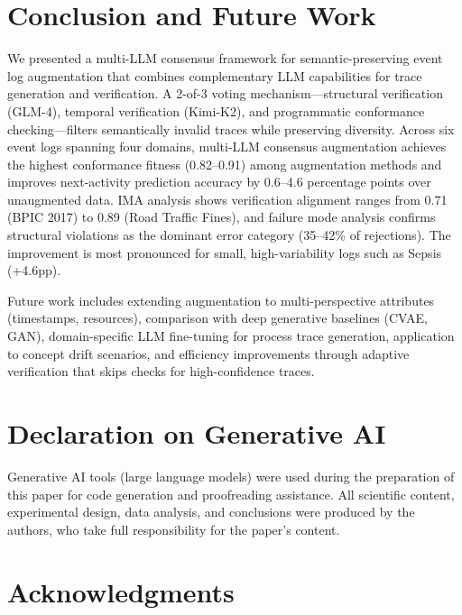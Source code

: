 \documentclass[11pt,a4paper]{article}
\newenvironment{acknowledgments}{\section*{Acknowledgments}}{\par}
\begin{document}
\section{Conclusion and Future Work}

We presented a multi-LLM consensus framework for semantic-preserving event log augmentation that combines complementary LLM capabilities for trace generation and verification. A 2-of-3 voting mechanism---structural verification (GLM-4), temporal verification (Kimi-K2), and programmatic conformance checking---filters semantically invalid traces while preserving diversity. Across six event logs spanning four domains, multi-LLM consensus augmentation achieves the highest conformance fitness (0.82--0.91) among augmentation methods and improves next-activity prediction accuracy by 0.6--4.6 percentage points over unaugmented data. IMA analysis shows verification alignment ranges from 0.71 (BPIC 2017) to 0.89 (Road Traffic Fines), and failure mode analysis confirms structural violations as the dominant error category (35--42\% of rejections). The improvement is most pronounced for small, high-variability logs such as Sepsis (+4.6pp).

Future work includes extending augmentation to multi-perspective attributes (timestamps, resources), comparison with deep generative baselines (CVAE, GAN), domain-specific LLM fine-tuning for process trace generation, application to concept drift scenarios, and efficiency improvements through adaptive verification that skips checks for high-confidence traces.


\section*{Declaration on Generative AI}

Generative AI tools (large language models) were used during the preparation of this paper for code generation and proofreading assistance. All scientific content, experimental design, data analysis, and conclusions were produced by the authors, who take full responsibility for the paper's content.


\begin{acknowledgments}
\end{acknowledgments}



\end{document}
